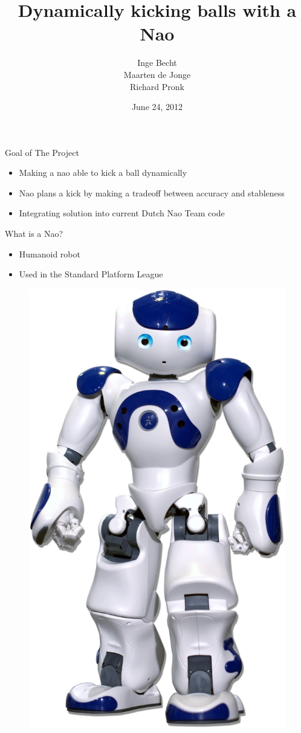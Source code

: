 \documentclass{beamer}
\title[Dynamically kicking balls]{Dynamically kicking balls with a
Nao}
\author{Inge Becht\\ Maarten de Jonge\\ Richard Pronk}
\institute{University of Amsterdam}
\date{June 24, 2012}
\begin{document}
\begin{frame}
\titlepage
\end{frame}

\begin{frame}{Goal of The Project}
    \begin{itemize}
        \item{Making a nao able to kick a ball dynamically}
        \item{Nao plans a kick by making a tradeoff between
             accuracy and stableness}
        \item{Integrating solution  into current Dutch Nao Team code}
    \end{itemize}
\end{frame}

\begin{frame}{What is a Nao?}
    \begin{itemize}
        \item{Humanoid robot}
        \item{Used in the Standard Platform League}
    \end{itemize}
     \begin{figure}[H] 
        \begin{center}
            \includegraphics[scale=0.2]{nao.jpg}

\end{center}
\end{figure}
\end{frame}
\end{document}

